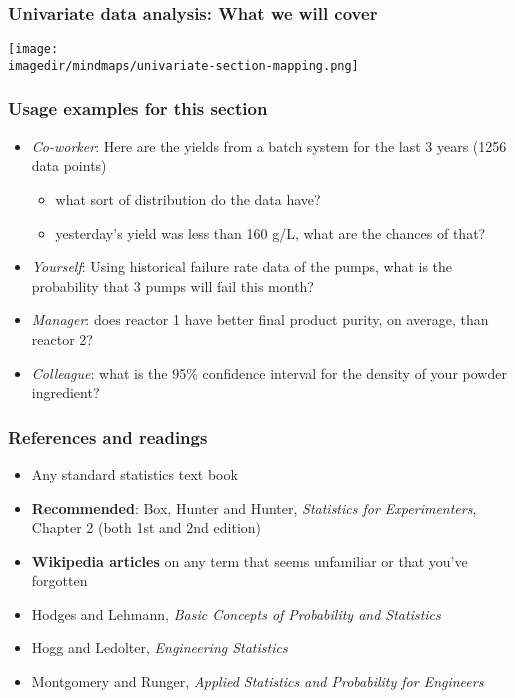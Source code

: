 
\begin{frame}\frametitle{Univariate data analysis: What we will cover}
	\texttt{[image: \\imagedir/mindmaps/univariate-section-mapping.png]}
\end{frame}

\begin{frame}\frametitle{Usage examples for this section}
	\begin{itemize}
		\item	\emph{Co-worker}: Here are the yields from a batch system for the last 3 years (1256 data points)
		\begin{itemize}
			\item	what sort of distribution do the data have?
			\item	yesterday's yield was less than 160 g/L, what are the chances of that?
		\end{itemize}
		\item	\emph{Yourself}: Using historical failure rate data of the pumps, what is the probability that 3 pumps will fail this month?
		\item	\emph{Manager}: does reactor 1 have better final product purity, on average, than reactor 2?
		\item	\emph{Colleague}: what is the 95\% confidence interval for the density of your powder ingredient?
	\end{itemize}
\end{frame}

\begin{frame}\frametitle{References and readings}
	\begin{itemize}
		\item	Any standard statistics text book
		\item	\textbf{Recommended}: Box, Hunter and Hunter, \emph{Statistics for Experimenters}, Chapter 2 (both 1st and 2nd edition)
		\item	\textbf{Wikipedia articles} on any term that seems unfamiliar or that you've forgotten

		\vspace{2cm}
		\item	Hodges and Lehmann, \emph{Basic Concepts of Probability and Statistics}
		\item	Hogg and Ledolter, \emph{Engineering Statistics}
		\item	Montgomery and Runger, \emph{Applied Statistics and Probability for Engineers}
	\end{itemize}
\end{frame}

